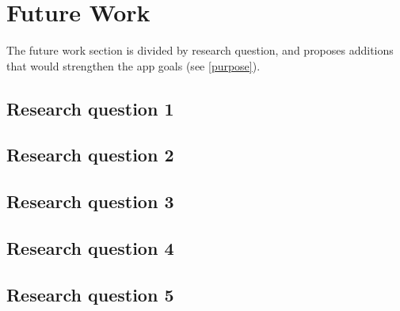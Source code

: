\section{Future Work}

The future work section is divided by research question, and proposes additions that would strengthen the app goals (see \ref{purpose}).

\subsection{Research question 1}


\subsection{Research question 2}


\subsection{Research question 3}


\subsection{Research question 4}


\subsection{Research question 5}

